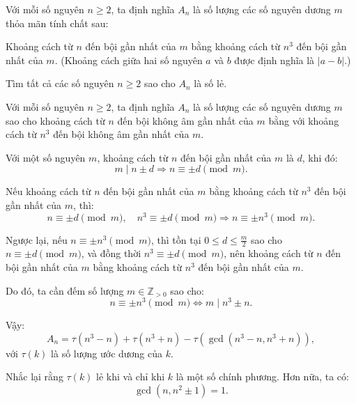 \ifshowproblemandsoln
\ifshowproblem\begin{problem}[\gls{BW 2015}/P20]\label{problem:BW-2015-P20}\fi
\ifshowsoln\begin{problem}\fi
    Với mỗi số nguyên \( n \ge 2 \), ta định nghĩa \( A_n \) là số lượng các số nguyên dương \( m \) thỏa mãn tính chất sau:

    Khoảng cách từ \( n \) đến bội gần nhất của \( m \) bằng khoảng cách từ \( n^3 \) đến bội gần nhất của \( m \).  
    (Khoảng cách giữa hai số nguyên \( a \) và \( b \) được định nghĩa là \( |a - b| \).)

    Tìm tất cả các số nguyên \( n \ge 2 \) sao cho \( A_n \) là số lẻ.
\end{problem}
\fi

\ifshowsoln
\begin{soln}\footnotemark
    Với mỗi số nguyên \( n \ge 2 \), ta định nghĩa \( A_n \) là số lượng các số nguyên dương \( m \)
    sao cho khoảng cách từ \( n \) đến bội không âm gần nhất của \( m \) bằng với khoảng cách từ \( n^3 \) đến bội không âm gần nhất của \( m \).

    Với một số nguyên \( m \), khoảng cách từ \( n \) đến bội gần nhất của \( m \) là \( d \), khi đó:
    \[
        m \mid n \pm d \Rightarrow n \equiv \pm d \pmod{m}.
    \]

    Nếu khoảng cách từ \( n \) đến bội gần nhất của \( m \) bằng khoảng cách từ \( n^3 \) đến bội gần nhất của \( m \), thì:
    \[
        n \equiv \pm d \pmod{m},\quad n^3 \equiv \pm d \pmod{m} \Rightarrow n \equiv \pm n^3 \pmod{m}.
    \]

    Ngược lại, nếu \( n \equiv \pm n^3 \pmod{m} \), thì tồn tại \( 0 \le d \le \frac{m}{2} \) sao cho \( n \equiv \pm d \pmod{m} \),
    và đồng thời \( n^3 \equiv \pm d \pmod{m} \), nên khoảng cách từ \( n \) đến bội gần nhất của \( m \)
    bằng khoảng cách từ \( n^3 \) đến bội gần nhất của \( m \).

    Do đó, ta cần đếm số lượng \( m \in \mathbb{Z}_{>0} \) sao cho:
    \[
        n \equiv \pm n^3 \pmod{m} \iff m \mid n^3 \pm n.
    \]

    Vậy:
    \[
        A_n = \tau(n^3 - n) + \tau(n^3 + n) - \tau(\gcd(n^3 - n, n^3 + n)),
    \]
    với \( \tau(k) \) là số lượng ước dương của \( k \).

    Nhắc lại rằng \( \tau(k) \) lẻ khi và chỉ khi \( k \) là một số chính phương. Hơn nữa, ta có:
    \[
        \gcd(n, n^2 \pm 1) = 1.
    \]


\end{soln}
\end{problem}
